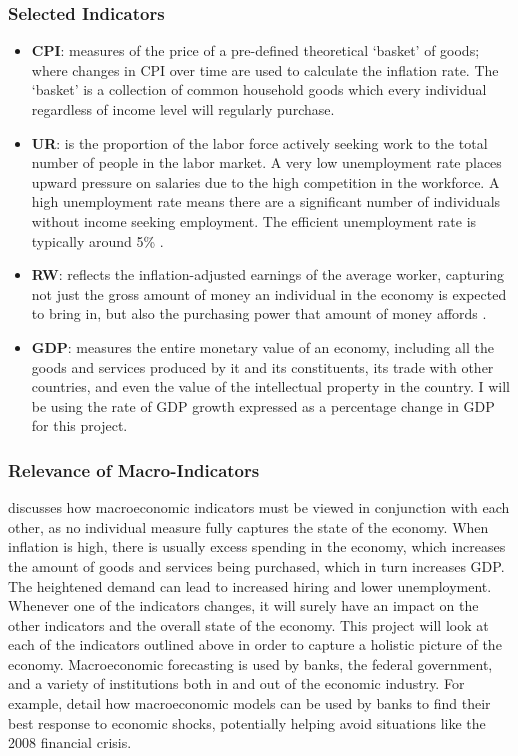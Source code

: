 \documentclass[10pt,twocolumn]{article}
\begin{document}
\subsubsection{Selected Indicators}
\begin{itemize}
  \item \textbf{CPI}: measures of the price of a pre-defined theoretical ‘basket’ of goods; where changes in CPI over time are used to calculate the inflation rate. The ‘basket’ is a collection of common household goods which every individual regardless of income level will regularly purchase.  
\item \textbf{UR}: is the proportion of the labor force actively seeking work to the total number of people in the labor market. A very low unemployment rate places upward pressure on salaries due to the high competition in the workforce. A high unemployment rate means there are a significant number of individuals without income seeking employment. The efficient unemployment rate is typically around 5\% \cite{voxeuUnemployment}.
  \item \textbf{RW}: reflects the inflation-adjusted earnings of the average worker, capturing not just the gross amount of money an individual in the economy is expected to bring in, but also the purchasing power that amount of money affords \cite{treasuryRealWages}.
  \item \textbf{GDP}: measures the entire monetary value of an economy, including all the goods and services produced by it and its constituents, its trade with other countries, and even the value of the intellectual property in the country. I will be using the rate of GDP growth expressed as a percentage change in GDP for this project.
\end{itemize}

\subsubsection{Relevance of Macro-Indicators}
\textcite{ravallion2021macroeconomicmisery} discusses how macroeconomic indicators must be viewed in conjunction with each other, as no individual measure fully captures the state of the economy. When inflation is high, there is usually excess spending in the economy, which increases the amount of goods and services being purchased, which in turn increases GDP. The heightened demand can lead to increased hiring and lower unemployment. Whenever one of the indicators changes, it will surely have an impact on the other indicators and the overall state of the economy. This project will look at each of the indicators outlined above in order to capture a holistic picture of the economy. Macroeconomic forecasting is used by banks, the federal government, and a variety of institutions both in and out of the economic industry. For example, \textcite{baltazar2020sustainableeconomies} detail how macroeconomic models can be used by banks to find their best response to economic shocks, potentially helping avoid situations like the 2008 financial crisis.
\end{document}
